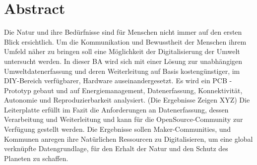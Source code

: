 \section*{Abstract}



Die Natur und ihre Bedürfnisse sind für Menschen nicht immer auf den ersten Blick ersichtlich. Um die Kommunikation und Bewusstheit der Menschen ihrem Umfeld näher zu bringen soll eine Möglichkeit der Digitalisierung der Umwelt untersucht werden.
In dieser BA wird sich mit einer Lösung zur unabhängigen Umweltdatenerfassung und deren Weiterleitung auf Basis kostengünstiger, im DIY-Bereich verfügbarer, Hardware auseinandergesetzt. Es wird ein PCB - Prototyp gebaut und auf Energiemanagement, Datenerfassung, Konnektivität, Autonomie und Reproduzierbarkeit analysiert.
(Die Ergebnisse Zeigen XYZ)
Die Leiterplatte erfüllt im Fazit die Anforderungen an Datenerfassung, dessen Verarbeitung und Weiterleitung und kann für die OpenSource-Community zur Verfügung gestellt werden.
Die Ergebnisse sollen Maker-Communities, und Kommunen anregen ihre Natürlichen Ressourcen zu Digitalisieren, um eine global verknüpfte Datengrundlage, für den Erhalt der Natur und den Schutz des Planeten zu schaffen.






    
    




    






